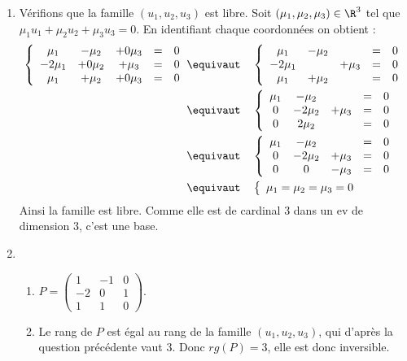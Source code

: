 \begin{correction}
\begin{enumerate}
\item Vérifions que la famille $(u_1,u_2,u_3)$ est libre. Soit $(\mu_1, \mu_2, \mu_3) \in \R^3$ tel que $\mu_1u_1 +\mu_2 u_2 +\mu_3 u_3 =0$. 
En identifiant chaque coordonnées on obtient : 
\begin{align*}
\left\{ 
\begin{array}{ccccc}
\mu_1 &-\mu_2 &+0\mu_3 &=&0\\
-2 \mu_1& +0\mu_2 &+\mu_3 &=&0\\
\mu_1& +\mu_2 &+0\mu_3 &=&0\\
\end{array} \right. &\equivaut \quad \left\{ 
\begin{array}{ccccc}
\mu_1 &-\mu_2 &  &=&0\\
-2 \mu_1&  &+\mu_3 &=&0\\
\mu_1& +\mu_2 & &=&0\\
\end{array} \right.\\
&\equivaut \quad \left\{ 
\begin{array}{ccccc}
\mu_1 &-\mu_2 &  &=&0\\
0& -2\mu_2 &+\mu_3 &=&0\\
0& 2\mu_2 & &=&0\\
\end{array} \right. \\
&\equivaut \quad \left\{ 
\begin{array}{ccccc}
\mu_1 &-\mu_2 &  &=&0\\
0& -2\mu_2 &+\mu_3 &=&0\\
0& 0 & -\mu_3&=&0\\
\end{array} \right.\\
&\equivaut \quad \left\{ 
\begin{array}{c}
\mu_1=\mu_2 =\mu_3 =0\\
\end{array} \right. 
\end{align*}
Ainsi la famille est libre. Comme elle est de cardinal $3$ dans un ev de dimension $3$, c'est une base. 
\item
\begin{enumerate}
\item $P= \left(\begin{array}{ccc}
1&-1&0\\
-2&0&1\\
1&1&0
\end{array}
\right).$
\item Le rang de $P$ est égal au rang de la famille $(u_1, u_2,u_3) $, qui d'après la question précédente vaut $3$. Donc $rg(P)=3$, elle est donc inversible. 


\end{enumerate}
\end{enumerate}
\end{correction}

